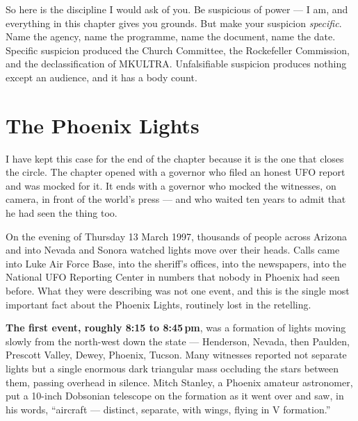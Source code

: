 So here is the discipline I would ask of you. Be suspicious of power --- I am, and everything in
this chapter gives you grounds. But make your suspicion \emph{specific}. Name the agency, name the programme, name the
document, name the date. Specific suspicion produced the Church Committee, the Rockefeller
Commission, and the declassification of MKULTRA. Unfalsifiable suspicion produces nothing except
an audience, and it has a body count.

\section{The Phoenix Lights}\label{sec:phoenixlights}

I have kept this case for the end of the chapter because it is the one that closes the circle.
The chapter opened with a governor who filed an honest UFO report and was mocked for it. It ends
with a governor who mocked the witnesses, on camera, in front of the world's press --- and who
waited ten years to admit that he had seen the thing too.

On the evening of Thursday 13 March 1997, thousands of people across Arizona and into Nevada and
Sonora watched lights move over their heads. Calls came into Luke Air Force Base, into the
sheriff's offices, into the newspapers, into the National UFO Reporting Center in numbers that
nobody in Phoenix had seen before. What they were describing was not one event, and this is the
single most important fact about the Phoenix Lights, routinely lost in the retelling.

\textbf{The first event, roughly 8:15 to 8:45\,pm}, was a formation of lights moving slowly from
the north-west down the state --- Henderson, Nevada, then Paulden, Prescott Valley, Dewey,
Phoenix, Tucson. Many witnesses reported not separate lights but a single enormous dark
triangular mass occluding the stars between them, passing overhead in silence. Mitch Stanley, a
Phoenix amateur astronomer, put a 10-inch Dobsonian telescope on the formation as it went over
and saw, in his words, ``aircraft --- distinct, separate, with wings, flying in V formation.''

